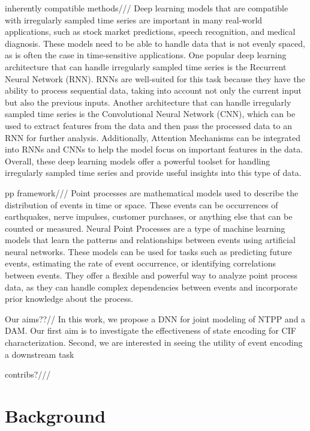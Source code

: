 \documentclass[journal,twoside,web]{ieeecolor}
\begin{document}
inherently compatible methods/// Deep learning models that are compatible with irregularly sampled time series are important in many real-world applications, such as stock market predictions, speech recognition, and medical diagnosis. These models need to be able to handle data that is not evenly spaced, as is often the case in time-sensitive applications. One popular deep learning architecture that can handle irregularly sampled time series is the Recurrent Neural Network (RNN). RNNs are well-suited for this task because they have the ability to process sequential data, taking into account not only the current input but also the previous inputs. Another architecture that can handle irregularly sampled time series is the Convolutional Neural Network (CNN), which can be used to extract features from the data and then pass the processed data to an RNN for further analysis. Additionally, Attention Mechanisms can be integrated into RNNs and CNNs to help the model focus on important features in the data. Overall, these deep learning models offer a powerful toolset for handling irregularly sampled time series and provide useful insights into this type of data.


pp framework/// Point processes are mathematical models used to describe the distribution of events in time or space. These events can be occurrences of earthquakes, nerve impulses, customer purchases, or anything else that can be counted or measured. Neural Point Processes are a type of machine learning models that learn the patterns and relationships between events using artificial neural networks. These models can be used for tasks such as predicting future events, estimating the rate of event occurrence, or identifying correlations between events. They offer a flexible and powerful way to analyze point process data, as they can handle complex dependencies between events and incorporate prior knowledge about the process.

Our aims??// In this work, we propose a DNN for joint modeling of NTPP and a DAM. Our first aim is to investigate the effectiveness of state encoding for CIF characterization. Second, we are interested in seeing the utility of event encoding a downstream task

contribs?/// 







\section{Background}
\label{sec:Background}
\end{document}

